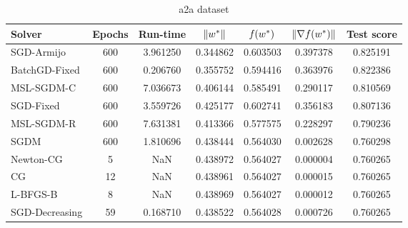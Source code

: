 \begin{table}
\caption{a2a dataset}
\label{tab:a2a-tab}
\centering
\begin{tabular}{lS[drop-zero-decimal]S[round-precision=4]S[round-precision=6]S[round-precision=6]S[exponent-mode=scientific]S[round-precision=6]}
\toprule
Solver & {Epochs} & {Run-time} & {$\lVert w^\ast\rVert$} & {$\operatorname*{\mathit{f}}(w^\ast)$} & {$\lVert\nabla f(w^\ast)\rVert$} & {Test score} \\
\midrule
SGD-Armijo & 600 & 3.961250 & 0.344862 & 0.603503 & 0.397378 & 0.825191 \\
BatchGD-Fixed & 600 & 0.206760 & 0.355752 & 0.594416 & 0.363976 & 0.822386 \\
MSL-SGDM-C & 600 & 7.036673 & 0.406144 & 0.585491 & 0.290117 & 0.810569 \\
SGD-Fixed & 600 & 3.559726 & 0.425177 & 0.602741 & 0.356183 & 0.807136 \\
MSL-SGDM-R & 600 & 7.631381 & 0.413366 & 0.577575 & 0.228297 & 0.790236 \\
SGDM & 600 & 1.810696 & 0.438444 & 0.564030 & 0.002628 & 0.760298 \\
Newton-CG & 5 & NaN & 0.438972 & 0.564027 & 0.000004 & 0.760265 \\
CG & 12 & NaN & 0.438961 & 0.564027 & 0.000015 & 0.760265 \\
L-BFGS-B & 8 & NaN & 0.438969 & 0.564027 & 0.000012 & 0.760265 \\
SGD-Decreasing & 59 & 0.168710 & 0.438522 & 0.564028 & 0.000726 & 0.760265 \\
\bottomrule
\end{tabular}
\end{table}

